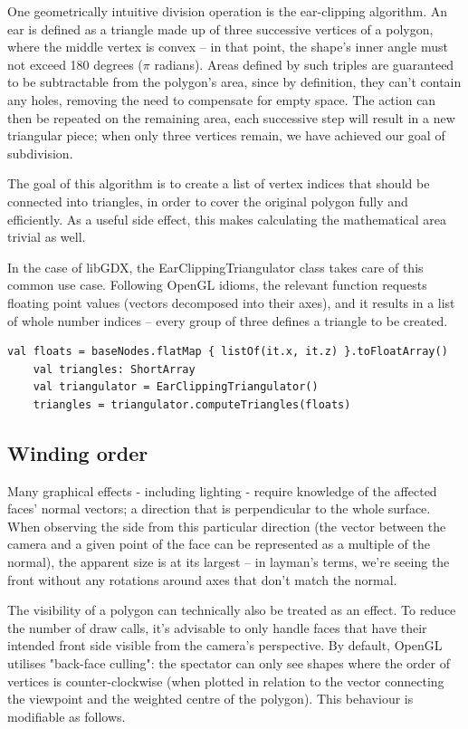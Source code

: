 One geometrically intuitive division operation is the ear-clipping algorithm. An ear is defined as a triangle made up of three successive vertices of a polygon, where the middle vertex is convex -- in that point, the shape's inner angle must not exceed 180 degrees ($\pi$ radians).\cite{TriangulationByEarClipping} Areas defined by such triples are guaranteed to be subtractable from the polygon's area, since by definition, they can't contain any holes, removing the need to compensate for empty space. The action can then be repeated on the remaining area, each successive step will result in a new triangular piece; when only three vertices remain, we have achieved our goal of subdivision.

The goal of this algorithm is to create a list of vertex indices that should be connected into triangles, in order to cover the original polygon fully and efficiently. As a useful side effect, this makes calculating the mathematical area trivial as well.

In the case of libGDX, the EarClippingTriangulator class takes care of this common use case. Following OpenGL idioms, the relevant function requests floating point values (vectors decomposed into their axes), and it results in a list of whole number indices -- every group of three defines a triangle to be created.

\begin{lstlisting}[caption=Example usage of the EarClippingTriangulator class]
    val floats = baseNodes.flatMap { listOf(it.x, it.z) }.toFloatArray()
    val triangles: ShortArray
    val triangulator = EarClippingTriangulator()
    triangles = triangulator.computeTriangles(floats)
\end{lstlisting}

\subsection{Winding order}

Many graphical effects - including lighting - require knowledge of the affected faces' normal vectors; a direction that is perpendicular to the whole surface.
When observing the side from this particular direction (the vector between the camera and a given point of the face can be represented as a multiple of the normal), the apparent size is at its largest -- in layman's terms, we're seeing the front without any rotations around axes that don't match the normal.

The visibility of a polygon can technically also be treated as an effect. To reduce the number of draw calls, it's advisable to only handle faces that have their intended front side visible from the camera's perspective. By default, OpenGL utilises "back-face culling": the spectator can only see shapes where the order of vertices is counter-clockwise (when plotted in relation to the vector connecting the viewpoint and the weighted centre of the polygon). This behaviour is modifiable as follows.

